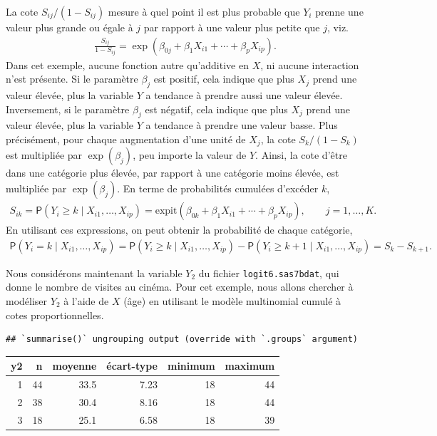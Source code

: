\documentclass[
  11pt,
  letterpaper,
]{book}
\theoremstyle{definition}
\theoremstyle{definition}
\theoremstyle{definition}
\theoremstyle{remark}
\begin{document}
La cote \(S_{ij}/(1-S_{ij})\) mesure à quel point il est plus probable que \(Y_i\) prenne une valeur plus grande ou égale à \(j\) par rapport à une valeur plus petite que \(j\), viz.
\begin{align*}
\frac{S_{ij}}{1-S_{ij}} = \exp( \beta_{0j} + \beta_1X_{i1} + \cdots + \beta_p X_{ip}).
\end{align*}
Dans cet exemple, aucune fonction autre qu'additive en \(X\), ni aucune interaction n'est présente. Si le paramètre \(\beta_j\) est positif, cela indique que plus \(X_j\) prend une valeur élevée, plus la variable \(Y\) a tendance à prendre aussi une valeur élevée. Inversement, si le paramètre \(\beta_j\) est négatif, cela indique que plus \(X_j\) prend une valeur élevée, plus la variable \(Y\) a tendance à prendre une valeur basse. Plus précisément, pour chaque augmentation d'une unité de \(X_j\), la cote \(S_k/(1-S_k)\) est multipliée par \(\exp(\beta_j)\), peu importe la valeur de \(Y\). Ainsi, la cote d'être dans une catégorie plus élevée, par rapport à une catégorie moins élevée, est multipliée par \(\exp(\beta_j)\). En terme de probabilités cumulées d'excéder \(k\),
\begin{align*}
S_{ik} = {\mathsf P}\left(Y_i \geq k \mid X_{i1}, \ldots, X_{ip}\right) = \mathrm{expit}(\beta_{0k} + \beta_1 X_{i1} + \cdots + \beta_p X_{ip}), \qquad j =1, \ldots, K.
\end{align*}
En utilisant ces expressions, on peut obtenir la probabilité de chaque catégorie,
\begin{align*}
{\mathsf P}\left(Y_i = k \mid X_{i1}, \ldots, X_{ip}\right) ={\mathsf P}\left(Y_i \geq k \mid X_{i1}, \ldots, X_{ip}\right) -{\mathsf P}\left(Y_i \geq k+1 \mid X_{i1}, \ldots, X_{ip}\right) = S_{k} - S_{k+1}.
\end{align*}

Nous considérons maintenant la variable \(Y_2\) du fichier \texttt{logit6.sas7bdat}, qui donne le nombre de visites au cinéma. Pour cet exemple, nous allons chercher à modéliser \(Y_2\) à l'aide de \(X\) (âge) en utilisant le modèle multinomial cumulé à cotes proportionnelles.

\begin{verbatim}
## `summarise()` ungrouping output (override with `.groups` argument)
\end{verbatim}

\begin{tabular}{rrrrrr}
\toprule
y2 & n & moyenne & écart-type & minimum & maximum\\
\midrule
1 & 44 & 33.5 & 7.23 & 18 & 44\\
2 & 38 & 30.4 & 8.16 & 18 & 44\\
3 & 18 & 25.1 & 6.58 & 18 & 39\\
\bottomrule
\end{tabular}
\end{document}
